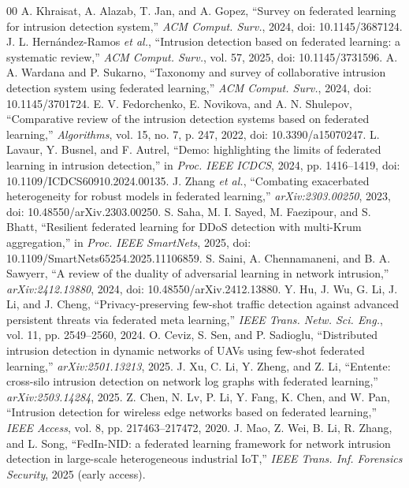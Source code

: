 \documentclass[conference,onecolumn]{IEEEtran}
\begin{document}
\begin{thebibliography}{00}
 A. Khraisat, A. Alazab, T. Jan, and A. Gopez, ``Survey on federated learning for intrusion detection system,'' \textit{ACM Comput. Surv.}, 2024, doi: 10.1145/3687124.
 J. L. Hern\'andez-Ramos \textit{et al.}, ``Intrusion detection based on federated learning: a systematic review,'' \textit{ACM Comput. Surv.}, vol. 57, 2025, doi: 10.1145/3731596.
 A. A. Wardana and P. Sukarno, ``Taxonomy and survey of collaborative intrusion detection system using federated learning,'' \textit{ACM Comput. Surv.}, 2024, doi: 10.1145/3701724.
 E. V. Fedorchenko, E. Novikova, and A. N. Shulepov, ``Comparative review of the intrusion detection systems based on federated learning,'' \textit{Algorithms}, vol. 15, no. 7, p. 247, 2022, doi: 10.3390/a15070247.
 L. Lavaur, Y. Busnel, and F. Autrel, ``Demo: highlighting the limits of federated learning in intrusion detection,'' in \textit{Proc. IEEE ICDCS}, 2024, pp. 1416--1419, doi: 10.1109/ICDCS60910.2024.00135.
 J. Zhang \textit{et al.}, ``Combating exacerbated heterogeneity for robust models in federated learning,'' \textit{arXiv:2303.00250}, 2023, doi: 10.48550/arXiv.2303.00250.
 S. Saha, M. I. Sayed, M. Faezipour, and S. Bhatt, ``Resilient federated learning for DDoS detection with multi-Krum aggregation,'' in \textit{Proc. IEEE SmartNets}, 2025, doi: 10.1109/SmartNets65254.2025.11106859.
 S. Saini, A. Chennamaneni, and B. A. Sawyerr, ``A review of the duality of adversarial learning in network intrusion,'' \textit{arXiv:2412.13880}, 2024, doi: 10.48550/arXiv.2412.13880.
 Y. Hu, J. Wu, G. Li, J. Li, and J. Cheng, ``Privacy-preserving few-shot traffic detection against advanced persistent threats via federated meta learning,'' \textit{IEEE Trans. Netw. Sci. Eng.}, vol. 11, pp. 2549--2560, 2024.
 O. Ceviz, S. Sen, and P. Sadioglu, ``Distributed intrusion detection in dynamic networks of UAVs using few-shot federated learning,'' \textit{arXiv:2501.13213}, 2025.
 J. Xu, C. Li, Y. Zheng, and Z. Li, ``Entente: cross-silo intrusion detection on network log graphs with federated learning,'' \textit{arXiv:2503.14284}, 2025.
 Z. Chen, N. Lv, P. Li, Y. Fang, K. Chen, and W. Pan, ``Intrusion detection for wireless edge networks based on federated learning,'' \textit{IEEE Access}, vol. 8, pp. 217463--217472, 2020.
 J. Mao, Z. Wei, B. Li, R. Zhang, and L. Song, ``FedIn-NID: a federated learning framework for network intrusion detection in large-scale heterogeneous industrial IoT,'' \textit{IEEE Trans. Inf. Forensics Security}, 2025 (early access).

\end{thebibliography}
\end{document}
